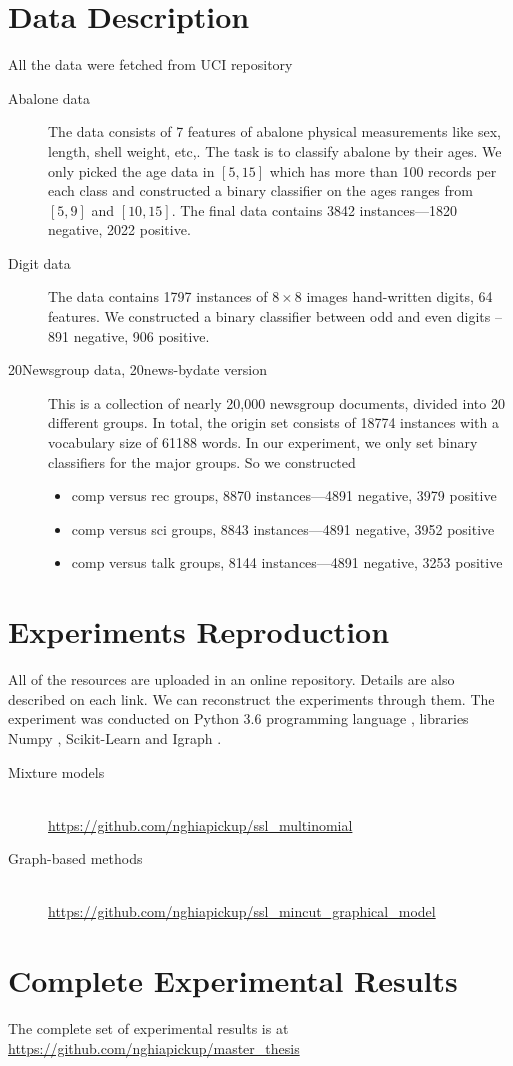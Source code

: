 \section*{Data Description}
All the data were fetched from UCI repository \parencite{Dua:2017}
\begin{description}
	\item[Abalone data] The data consists of 7 features of abalone physical measurements like sex, length, shell weight, etc,. The task is to classify abalone by their ages. We only picked the age data in $[5, 15]$ which has more than 100 records per each class and constructed a binary classifier on the ages ranges from $[5,9]$ and $[10, 15]$. The final data contains 3842 instances---1820 negative, 2022 positive.
	
	\item[Digit data] The data contains 1797 instances of $8 \times 8$ images hand-written digits, 64 features. We constructed a binary classifier between odd and even digits -- 891 negative, 906 positive.
		
	\item[20Newsgroup data, 20news-bydate version] This is a collection of nearly 20,000 newsgroup documents, divided into 20 different groups. In total, the origin set consists of 18774 instances with a vocabulary size of 61188 words. In our experiment, we only set binary classifiers for the major groups. So we constructed 
	\begin{itemize}
		\item comp versus rec groups, 8870 instances---4891 negative, 3979 positive
		\item comp versus sci groups, 8843 instances---4891 negative, 3952 positive
		\item comp versus talk groups, 8144 instances---4891 negative, 3253 positive
	\end{itemize}
\end{description}

\section*{Experiments Reproduction}
All of the resources are uploaded in an online repository. Details are also described on each link. We can reconstruct the experiments through them. The experiment was conducted on Python 3.6 programming language \parencite{python3.6}, libraries Numpy \parencite{numpy}, Scikit-Learn \parencite{scikit-learn} and Igraph \parencite{Csardi2006}.
\begin{description}
	\item[Mixture models] \hfill \\ \url{https://github.com/nghiapickup/ssl_multinomial}
	\item[Graph-based methods] \hfill \\ \url{https://github.com/nghiapickup/ssl_mincut_graphical_model}
\end{description}

\section*{Complete Experimental Results}
The complete set of experimental results is at \url{https://github.com/nghiapickup/master_thesis}